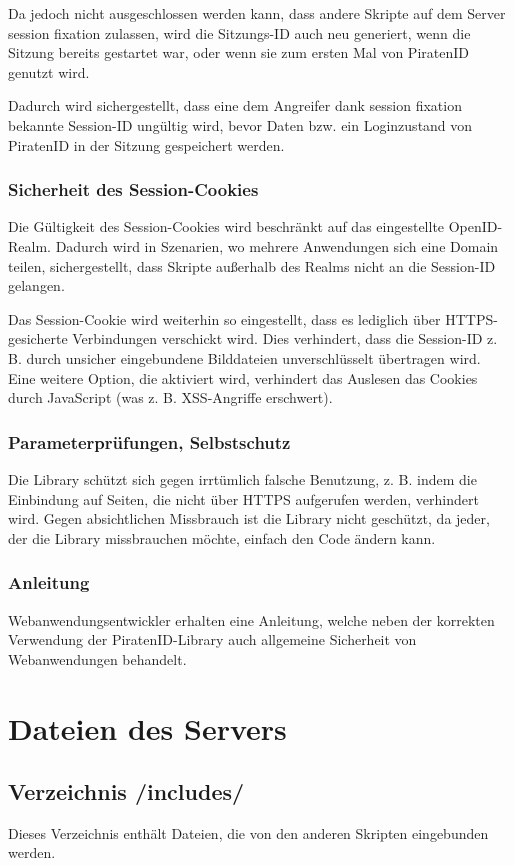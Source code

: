 \documentclass[parskip=half]{scrartcl}
\begin{document}
Da jedoch nicht ausgeschlossen werden kann, dass andere Skripte auf dem Server session fixation zulassen,
wird die Sitzungs-ID auch neu generiert, wenn die Sitzung bereits gestartet war,
oder wenn sie zum ersten Mal von PiratenID genutzt wird.

Dadurch wird sichergestellt, dass eine dem Angreifer dank session fixation bekannte Session-ID ungültig wird,
bevor Daten bzw. ein Loginzustand von PiratenID in der Sitzung gespeichert werden.

\subsubsection{Sicherheit des Session-Cookies}
Die Gültigkeit des Session-Cookies wird beschränkt auf das eingestellte OpenID-Realm.
Dadurch wird in Szenarien, wo mehrere Anwendungen sich eine Domain teilen, sichergestellt,
dass Skripte außerhalb des Realms nicht an die Session-ID gelangen.

Das Session-Cookie wird weiterhin so eingestellt, dass es lediglich über HTTPS-gesicherte Verbindungen verschickt wird.
Dies verhindert, dass die Session-ID z. B. durch unsicher eingebundene Bilddateien unverschlüsselt übertragen wird.
Eine weitere Option, die aktiviert wird, verhindert das Auslesen das Cookies durch JavaScript (was z. B. XSS-Angriffe erschwert).

\subsubsection{Parameterprüfungen, Selbstschutz}
Die Library schützt sich gegen irrtümlich falsche Benutzung,
z. B. indem die Einbindung auf Seiten, die nicht über HTTPS aufgerufen werden, verhindert wird.
Gegen absichtlichen Missbrauch ist die Library nicht geschützt, da jeder, der die Library missbrauchen möchte, einfach den Code ändern kann.

\subsubsection{Anleitung}
Webanwendungsentwickler erhalten eine Anleitung, welche neben der korrekten Verwendung der PiratenID-Library auch allgemeine Sicherheit von Webanwendungen behandelt.


\section{Dateien des Servers}

\subsection{Verzeichnis /includes/}
Dieses Verzeichnis enthält Dateien, die von den anderen Skripten eingebunden werden.
\end{document}
